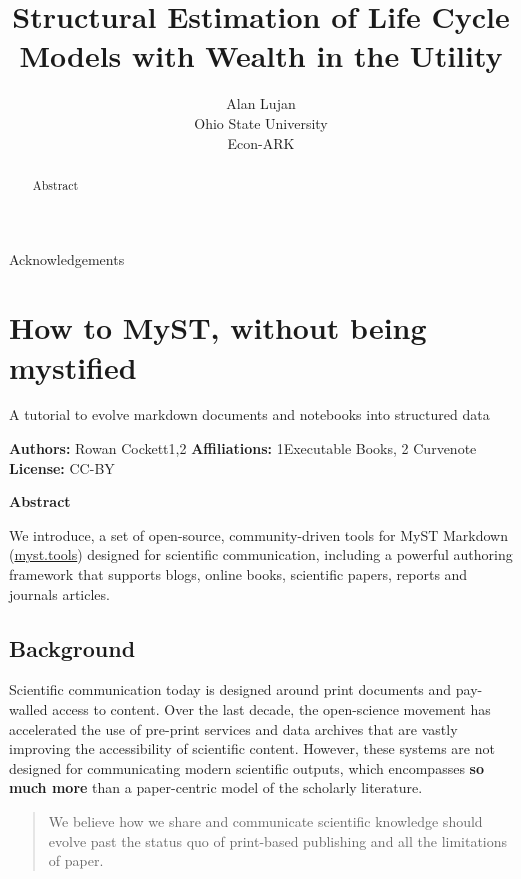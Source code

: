 \documentclass{article}
\title{Structural Estimation of Life Cycle Models with Wealth in the Utility}
\date{\displaydate{articleDate}}
\author{Alan Lujan\footnotemark[1]\\
Ohio State University\\Econ-ARK\\}
\begin{document}
\maketitle
{}

\begin{abstract}
Abstract
\end{abstract}


Acknowledgements

\section{How to MyST, without being mystified 🧙}\label{How to MyST, without being mystified 🧙}

A tutorial to evolve markdown documents and notebooks into structured data

\textbf{Authors:} Rowan Cockett1,2 \newline
\textbf{Affiliations:} 1Executable Books, 2 Curvenote \newline
\textbf{License:} CC-BY

\textbf{Abstract}

We introduce, a set of open-source, community-driven tools for MyST Markdown (\href{https://myst.tools}{myst.tools}) designed for scientific communication, including a powerful authoring framework that supports blogs, online books, scientific papers, reports and journals articles.

\subsection{Background}\label{Background}

Scientific communication today is designed around print documents and pay-walled access to content. Over the last decade, the open-science movement has accelerated the use of pre-print services and data archives that are vastly improving the accessibility of scientific content. However, these systems are not designed for communicating modern scientific outputs, which encompasses \textbf{so much more} than a paper-centric model of the scholarly literature.

\begin{quote}
We believe how we share and communicate scientific knowledge should evolve past the status quo of print-based publishing and all the limitations of paper.
\end{quote}
\end{document}
